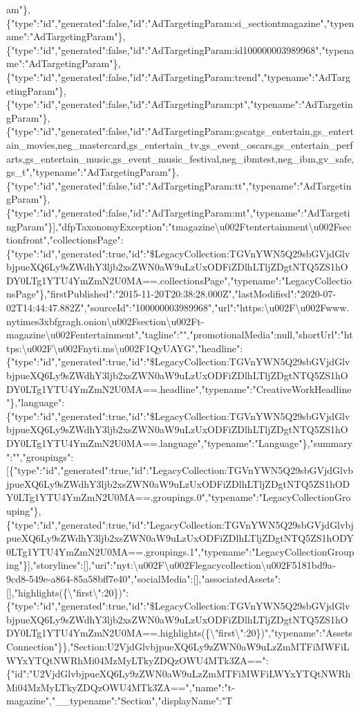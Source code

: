 am"\},\{"type":"id","generated":false,"id":"AdTargetingParam:si\_sectiontmagazine","typename":"AdTargetingParam"\},\{"type":"id","generated":false,"id":"AdTargetingParam:id100000003989968","typename":"AdTargetingParam"\},\{"type":"id","generated":false,"id":"AdTargetingParam:trend","typename":"AdTargetingParam"\},\{"type":"id","generated":false,"id":"AdTargetingParam:pt","typename":"AdTargetingParam"\},\{"type":"id","generated":false,"id":"AdTargetingParam:gscatgs\_entertain,gs\_entertain\_movies,neg\_mastercard,gs\_entertain\_tv,gs\_event\_oscars,gs\_entertain\_perfarts,gs\_entertain\_music,gs\_event\_music\_festival,neg\_ibmtest,neg\_ibm,gv\_safe,gs\_t","typename":"AdTargetingParam"\},\{"type":"id","generated":false,"id":"AdTargetingParam:tt","typename":"AdTargetingParam"\},\{"type":"id","generated":false,"id":"AdTargetingParam:mt","typename":"AdTargetingParam"\}{]},"dfpTaxonomyException":"tmagazine\textbackslash{}u002Ftentertainment\textbackslash{}u002Fsectionfront","collectionsPage":\{"type":"id","generated":true,"id":"\$LegacyCollection:TGVnYWN5Q29sbGVjdGlvbjpueXQ6Ly9sZWdhY3ljb2xsZWN0aW9uLzUxODFiZDlhLTljZDgtNTQ5ZS1hODY0LTg1YTU4YmZmN2U0MA==.collectionsPage","typename":"LegacyCollectionsPage"\},"firstPublished":"2015-11-20T20:38:28.000Z","lastModified":"2020-07-02T14:44:47.882Z","sourceId":"100000003989968","url":"https:\textbackslash{}u002F\textbackslash{}u002Fwww.nytimes3xbfgragh.onion\textbackslash{}u002Fsection\textbackslash{}u002Ft-magazine\textbackslash{}u002Fentertainment","tagline":"","promotionalMedia":null,"shortUrl":"https:\textbackslash{}u002F\textbackslash{}u002Fnyti.ms\textbackslash{}u002F1QyUAYG","headline":\{"type":"id","generated":true,"id":"\$LegacyCollection:TGVnYWN5Q29sbGVjdGlvbjpueXQ6Ly9sZWdhY3ljb2xsZWN0aW9uLzUxODFiZDlhLTljZDgtNTQ5ZS1hODY0LTg1YTU4YmZmN2U0MA==.headline","typename":"CreativeWorkHeadline"\},"language":\{"type":"id","generated":true,"id":"\$LegacyCollection:TGVnYWN5Q29sbGVjdGlvbjpueXQ6Ly9sZWdhY3ljb2xsZWN0aW9uLzUxODFiZDlhLTljZDgtNTQ5ZS1hODY0LTg1YTU4YmZmN2U0MA==.language","typename":"Language"\},"summary":"","groupings":{[}\{"type":"id","generated":true,"id":"LegacyCollection:TGVnYWN5Q29sbGVjdGlvbjpueXQ6Ly9sZWdhY3ljb2xsZWN0aW9uLzUxODFiZDlhLTljZDgtNTQ5ZS1hODY0LTg1YTU4YmZmN2U0MA==.groupings.0","typename":"LegacyCollectionGrouping"\},\{"type":"id","generated":true,"id":"LegacyCollection:TGVnYWN5Q29sbGVjdGlvbjpueXQ6Ly9sZWdhY3ljb2xsZWN0aW9uLzUxODFiZDlhLTljZDgtNTQ5ZS1hODY0LTg1YTU4YmZmN2U0MA==.groupings.1","typename":"LegacyCollectionGrouping"\}{]},"storylines":{[}{]},"uri":"nyt:\textbackslash{}u002F\textbackslash{}u002Flegacycollection\textbackslash{}u002F5181bd9a-9cd8-549e-a864-85a58bff7e40","socialMedia":{[}{]},"associatedAssets":{[}{]},"highlights(\{\textbackslash{}"first\textbackslash{}":20\})":\{"type":"id","generated":true,"id":"\$LegacyCollection:TGVnYWN5Q29sbGVjdGlvbjpueXQ6Ly9sZWdhY3ljb2xsZWN0aW9uLzUxODFiZDlhLTljZDgtNTQ5ZS1hODY0LTg1YTU4YmZmN2U0MA==.highlights(\{\textbackslash{}"first\textbackslash{}":20\})","typename":"AssetsConnection"\}\},"Section:U2VjdGlvbjpueXQ6Ly9zZWN0aW9uLzZmMTFiMWFiLWYxYTQtNWRhMi04MzMyLTkyZDQzOWU4MTk3ZA==":\{"id":"U2VjdGlvbjpueXQ6Ly9zZWN0aW9uLzZmMTFiMWFiLWYxYTQtNWRhMi04MzMyLTkyZDQzOWU4MTk3ZA==","name":"t-magazine","\_\_typename":"Section","displayName":"T
